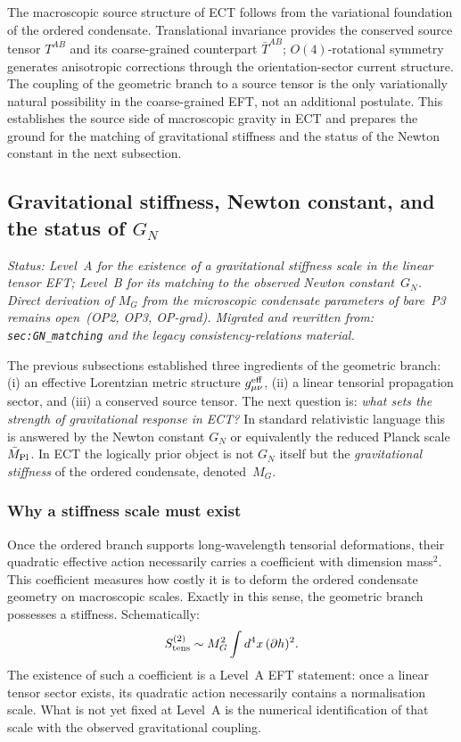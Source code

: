 The macroscopic source structure of ECT follows from the variational
foundation of the ordered condensate.
Translational invariance provides the conserved source tensor
$T^{AB}$ and its coarse-grained counterpart $\bar{T}^{AB}$;
$O(4)$-rotational symmetry generates anisotropic corrections through
the orientation-sector current structure.
The coupling of the geometric branch to a source tensor is the only
variationally natural possibility in the coarse-grained EFT, not an
additional postulate.
This establishes the source side of macroscopic gravity in ECT and
prepares the ground for the matching of gravitational stiffness and
the status of the Newton constant in the next subsection.


\subsection{Gravitational stiffness, Newton constant,
and the status of $G_N$}
\label{sec:mp_matching}

\textit{Status: Level~A for the existence of a gravitational stiffness
scale in the linear tensor EFT; Level~B for its matching to the observed
Newton constant~$G_N$. Direct derivation of $M_G$ from the microscopic
condensate parameters of bare~P3 remains open~(OP2, OP3, OP-grad).
Migrated and rewritten from: \texttt{sec:GN\_matching} and the legacy
consistency-relations material.}

\medskip
The previous subsections established three ingredients of the geometric
branch: (i) an effective Lorentzian metric structure $g^{\rm eff}_{\mu\nu}$,
(ii) a linear tensorial propagation sector, and (iii) a conserved source
tensor.
The next question is: \emph{what sets the strength of gravitational
response in ECT?}
In standard relativistic language this is answered by the Newton constant
$G_N$ or equivalently the reduced Planck scale $\bar M_{\rm Pl}$.
In ECT the logically prior object is not $G_N$ itself but the
\emph{gravitational stiffness} of the ordered condensate, denoted~$M_G$.

\subsubsection*{Why a stiffness scale must exist}

Once the ordered branch supports long-wavelength tensorial deformations,
their quadratic effective action necessarily carries a coefficient with
dimension mass$^2$.
This coefficient measures how costly it is to deform the ordered
condensate geometry on macroscopic scales.
Exactly in this sense, the geometric branch possesses a stiffness.
Schematically:
\begin{equation}
  \label{eq:grav_stiffness_schematic}
  S_{\rm tens}^{(2)}
  \sim
  M_G^2 \int d^4x\,(\partial h)^2.
\end{equation}
The existence of such a coefficient is a Level~A EFT statement:
once a linear tensor sector exists, its quadratic action necessarily
contains a normalisation scale.
What is not yet fixed at Level~A is the numerical identification
of that scale with the observed gravitational coupling.

